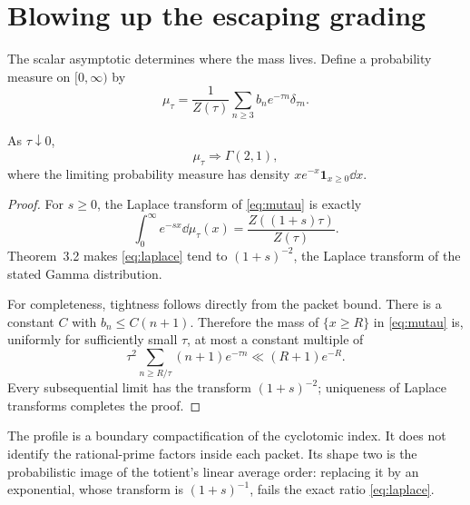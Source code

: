 \section{Blowing up the escaping grading}

The scalar asymptotic determines where the mass lives.  Define a probability
measure on $[0,\infty)$ by
\begin{equation}
\mu_\tau=\frac1{Z(\tau)}
\sum_{n\ge3}b_ne^{-\tau n}\delta_{\tau n}.
\label{eq:mutau}
\end{equation}

\begin{theorem}
As $\tau\downarrow0$,
\begin{equation}
\mu_\tau\Longrightarrow \Gamma(2,1),
\label{eq:gamma}
\end{equation}
where the limiting probability measure has density
$xe^{-x}\mathbf1_{x\ge0}\dd x$.
\end{theorem}

\begin{proof}
For $s\ge0$, the Laplace transform of \eqref{eq:mutau} is exactly
\begin{equation}
\int_0^\infty e^{-sx}\dd\mu_\tau(x)
=\frac{Z((1+s)\tau)}{Z(\tau)}.
\label{eq:laplace}
\end{equation}
Theorem~3.2 makes \eqref{eq:laplace} tend to $(1+s)^{-2}$, the Laplace
transform of the stated Gamma distribution.

For completeness, tightness follows directly from the packet bound.  There
is a constant $C$ with $b_n\le C(n+1)$.  Therefore the mass of
$\{x\ge R\}$ in \eqref{eq:mutau} is, uniformly for sufficiently small
$\tau$, at most a constant multiple of
\[
\tau^2\sum_{n\ge R/\tau}(n+1)e^{-\tau n}
\ll(R+1)e^{-R}.
\]
Every subsequential limit has the transform $(1+s)^{-2}$; uniqueness of
Laplace transforms completes the proof.
\end{proof}

The profile is a boundary compactification of the cyclotomic index.  It does
not identify the rational-prime factors inside each packet.  Its shape two is
the probabilistic image of the totient's linear average order: replacing it
by an exponential, whose transform is $(1+s)^{-1}$, fails the exact ratio
\eqref{eq:laplace}.
